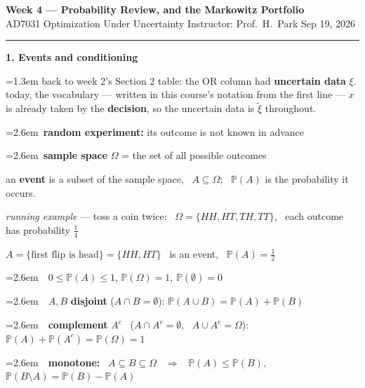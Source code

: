 \documentclass[10pt]{article}
\newcommand{\beat}[2]{%
  \par\bigskip\vspace{4pt}
  {\color{ruleink}\rule{\textwidth}{1pt}}\par\nobreak\vspace{4pt}
  {\large\bfseries #1.\; #2}\par\nobreak\vspace{6pt}}
\newenvironment{board}{%
  \par\vspace{4pt}
  \begingroup\leftskip=1.3em\relax\parskip=2pt\relax}{%
  \par\endgroup\vspace{4pt}}
\newcommand{\bul}{\hangindent=2.6em\hangafter=1\hspace{1.2em}\textbullet\ \ignorespaces}
\begin{document}
{\Large\bfseries Week 4 --- Probability Review, and the Markowitz Portfolio}\\[2pt]
{\small AD7031 Optimization Under Uncertainty \quad\textbullet\quad Instructor: Prof.\ H.\ Park \quad\textbullet\quad Sep 19, 2026}

\beat{1}{Events and conditioning}
\begin{board}
back to week 2's Section 2 table: the OR column had \textbf{uncertain data} $\xi$. today, the vocabulary ---
written in this course's notation from the first line --- $x$ is already taken by the
\textbf{decision}, so the uncertain data is $\tilde\xi$ throughout.
\vspace{10pt}

\bul \textbf{random experiment:} its outcome is not known in advance
\vspace{3pt}

\bul \textbf{sample space} $\Omega$ = the set of all possible outcomes
\vspace{10pt}

an \textbf{event} is a subset of the sample space, \ $A \subseteq \Omega$; \ $\mathbb{P}(A)$ is the probability it occurs.
\vspace{5pt}

\quad \emph{running example} --- toss a coin twice: \ $\Omega = \{HH, HT, TH, TT\}$, \ each outcome has probability $\tfrac14$
\vspace{3pt}

\quad $A = \{\text{first flip is head}\} = \{HH, HT\}$ \ is an event, \ $\mathbb{P}(A) = \tfrac12$
\vspace{8pt}

\bul \ $0 \le \mathbb{P}(A) \le 1$, \qquad $\mathbb{P}(\Omega) = 1$, \qquad $\mathbb{P}(\emptyset) = 0$
\vspace{3pt}

\bul \ $A, B$ \textbf{disjoint} ($A \cap B = \emptyset$): \qquad $\mathbb{P}(A \cup B) = \mathbb{P}(A) + \mathbb{P}(B)$
\vspace{3pt}

\bul \ \textbf{complement} $A^c$ \ ($A \cap A^c = \emptyset$, \ $A \cup A^c = \Omega$): \qquad
$\mathbb{P}(A) + \mathbb{P}(A^c) = \mathbb{P}(\Omega) = 1$
\vspace{3pt}

\bul \ \textbf{monotone:} \ $A \subseteq B \subseteq \Omega$ \ $\Rightarrow$ \ $\mathbb{P}(A) \le \mathbb{P}(B)$, \qquad
$\mathbb{P}(B \setminus A) = \mathbb{P}(B) - \mathbb{P}(A)$
\vspace{3pt}


\end{board}
\end{document}
